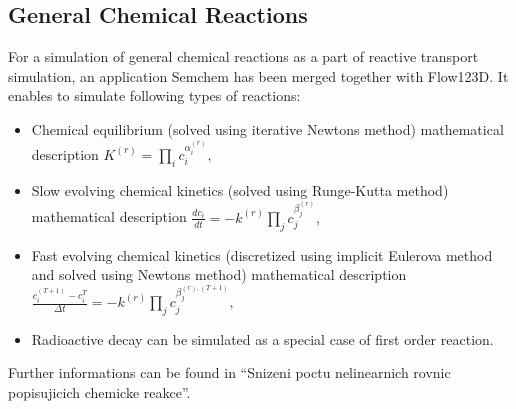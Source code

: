 \subsection{General Chemical Reactions}
For a simulation of general chemical reactions as a part of reactive transport simulation, an application Semchem has been merged together with Flow123D. It enables to simulate following types of reactions:
\begin{itemize}
  \item Chemical equilibrium (solved using iterative Newtons method)
    \subitem mathematical description $K^{(r)} = \prod_i c_i^{\alpha_i^{(r)}},$

  \item Slow evolving chemical kinetics (solved using Runge-Kutta method)
    \subitem mathematical description $\frac{dc_i}{dt} = -k^{(r)}\prod_j c_j^{\beta_j^{(r)}},$

  \item Fast evolving chemical kinetics (discretized using implicit Eulerova method and solved using Newtons method)
     \subitem mathematical description $\frac{c_i^{(T+1)} - c_i^{T}}{\Delta t} = -k^{(r)}\prod_j c_j^{\beta_j^{(r),(T+1)}},$
  \item Radioactive decay can be simulated as a special case of first order reaction.
\end{itemize}

Further informations can be found in ``Snizeni poctu nelinearnich rovnic popisujicich chemicke reakce''.